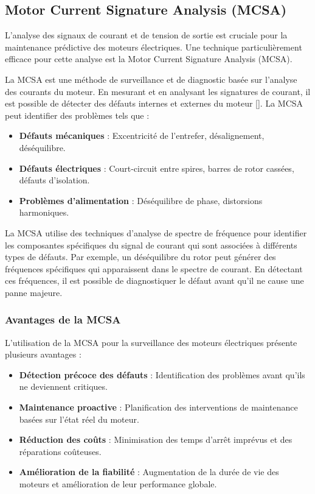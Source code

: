 \subsection*{Motor Current Signature Analysis (MCSA)}

L'analyse des signaux de courant et de tension de sortie est cruciale pour la
maintenance prédictive des moteurs électriques. Une technique particulièrement
efficace pour cette analyse est la Motor Current Signature Analysis (MCSA).

La MCSA est une méthode de surveillance et de diagnostic basée sur l'analyse
des courants du moteur. En mesurant et en analysant les signatures de courant,
il est possible de détecter des défauts internes et externes du moteur
	[\cite{bonetjara2023sensorless}]. La MCSA peut identifier des problèmes tels
que :
\begin{itemize}
	\item \textbf{Défauts mécaniques} : Excentricité de l'entrefer, désalignement, déséquilibre.
	\item \textbf{Défauts électriques} : Court-circuit entre spires, barres de rotor cassées, défauts d'isolation.
	\item \textbf{Problèmes d'alimentation} : Déséquilibre de phase, distorsions harmoniques.
\end{itemize}

La MCSA utilise des techniques d'analyse de spectre de fréquence pour
identifier les composantes spécifiques du signal de courant qui sont associées
à différents types de défauts. Par exemple, un déséquilibre du rotor peut
générer des fréquences spécifiques qui apparaissent dans le spectre de courant.
En détectant ces fréquences, il est possible de diagnostiquer le défaut avant
qu'il ne cause une panne majeure.

\subsubsection*{Avantages de la MCSA}

L'utilisation de la MCSA pour la surveillance des moteurs électriques présente
plusieurs avantages :
\begin{itemize}
	\item \textbf{Détection précoce des défauts} : Identification des problèmes avant qu'ils ne deviennent critiques.
	\item \textbf{Maintenance proactive} : Planification des interventions de maintenance basées sur l'état réel du moteur.
	\item \textbf{Réduction des coûts} : Minimisation des temps d'arrêt imprévus et des réparations coûteuses.
	\item \textbf{Amélioration de la fiabilité} : Augmentation de la durée de vie des moteurs et amélioration de leur performance globale.
\end{itemize}

